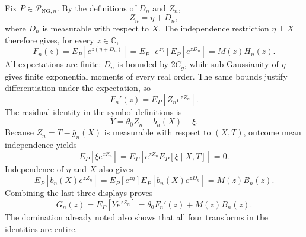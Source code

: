 Fix \(P\in\mathcal P_{\mathrm{NG},n}\).  By the definitions of \(D_n\) and \(Z_n\),
\[
 Z_n=\eta+D_n,
\]
where \(D_n\) is measurable with respect to \(X\).  The independence restriction \(\eta\perp X\) therefore gives, for every \(z\in\mathbb C\),
\[
 F_n(z)
 =E_P[e^{z(\eta+D_n)}]
 =E_P[e^{z\eta}]E_P[e^{zD_n}]
 =M(z)H_n(z).
\]
All expectations are finite: \(D_n\) is bounded by \(2C_g\), while sub-Gaussianity of \(\eta\) gives finite exponential moments of every real order.  The same bounds justify differentiation under the expectation, so
\[
 F_n'(z)=E_P[Z_ne^{zZ_n}].
\]
The residual identity in the symbol definitions is
\[
 Y=\theta_0Z_n+b_n(X)+\xi.
\]
Because \(Z_n=T-\bar g_n(X)\) is measurable with respect to \((X,T)\), outcome mean independence yields
\[
 E_P[\xi e^{zZ_n}]
 =E_P\!\left[e^{zZ_n}E_P[\xi\mid X,T]\right]
 =0.
\]
Independence of \(\eta\) and \(X\) also gives
\[
 E_P[b_n(X)e^{zZ_n}]
 =E_P[e^{z\eta}]E_P[b_n(X)e^{zD_n}]
 =M(z)B_n(z).
\]
Combining the last three displays proves
\[
 G_n(z)=E_P[Ye^{zZ_n}]=\theta_0F_n'(z)+M(z)B_n(z).
\]
The domination already noted also shows that all four transforms in the identities are entire.